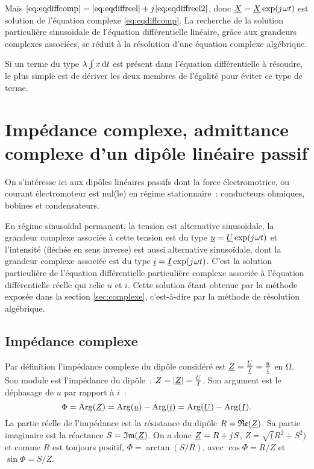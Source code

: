        Mais $\eqref{eq:eqdiffcomp} = \eqref{eq:eqdiffreel} + {j\mkern1mu} \eqref{eq:eqdiffreel2}$, donc $\underline{X} = \underline{X} \exp({j\mkern1mu}\omega t)$ est solution de l'équation complexe \eqref{eq:eqdiffcomp}. La recherche de la solution particulière sinusoïdale de l'équation différentielle linéaire, grâce aux grandeurs complexes associées, se réduit à la résolution d'une équation complexe algébrique.

        Si un terme du type $\lambda \int x \mathop{}\mathopen{}\mathrm{d}{}t$ est présent dans l'équation différentielle à résoudre, le plus simple est de dériver les deux membres de l'égalité pour éviter ce type de terme.
\section{Impédance complexe, admittance complexe d'un dipôle linéaire passif}
    On s'intéresse ici aux dipôles linéaires passifs dont la force électromotrice, ou courant électromoteur est nul(le) en régime stationnaire~: conducteurs ohmiques, bobines et condensateurs.

    En régime sinusoïdal permanent, la tension est alternative sinusoïdale, la grandeur complexe associée à cette tension est du type $\underline{u} = \underline{U} \exp({j\mkern1mu}\omega t)$ et l'intensité (fléchée en sens inverse) est aussi alternative sinusoïdale, dont la grandeur complexe associée est du type $\underline{i} = \underline{I} \exp({j\mkern1mu}\omega t)$. C'est la solution particulière de l'équation différentielle particulière complexe associée à l'équation différentielle réelle qui relie $u$ et $i$. Cette solution étant obtenue par la méthode exposée dans la section \ref{sec:complexe}, c'est-à-dire par la méthode de résolution algébrique.
    \subsection{Impédance complexe}
        Par définition l'impédance complexe du dipôle considéré est $\underline{Z} = \frac{\underline{U}}{\underline{I}}=\frac{\underline{u}}{\underline{i}}$ en $\si{\ohm}$. Son module est l'impédance du dipôle~: $Z = \left\lvert\underline{Z}\right\rvert = \frac{U}{I}$. Son argument est le déphasage de $u$ par rapport à $i$~:
        \begin{equation}
            \Phi = \operatorname{Arg}(\underline{Z}) = \operatorname{Arg}(\underline{u}) - \operatorname{Arg}(\underline{i}) = \operatorname{Arg}(\underline{U}) - \operatorname{Arg}(\underline{I}).
        \end{equation}
        La partie réelle de l'impédance est la résistance du dipôle $R = \mathfrak{Re}(\underline{Z})$. Sa partie imaginaire est la réactance $S=\mathfrak{Im}(\underline{Z})$. On a donc $\underline{Z} = R + {j\mkern1mu} S$, $Z = \sqrt(R^2+S^2)$ et comme $R$ est toujours positif, $\Phi = \arctan(S/R)$, avec $\cos\Phi = R/Z$ et $\sin\Phi=S/Z$.
